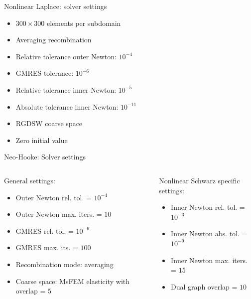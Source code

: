 \begin{frame}[noframenumbering]{Nonlinear Laplace: solver settings}
	\begin{itemize}
		\item $300\times 300$ elements per subdomain
		\item Averaging recombination
		\item Relative tolerance outer Newton: $10^{-4}$
		\item GMRES tolerance: $10^{-6}$
		\item Relative tolerance inner Newton: $10^{-5}$
		\item Absolute tolerance inner Newton: $10^{-11}$
		\item RGDSW coarse space
		\item Zero initial value
	\end{itemize}
\end{frame}

\begin{frame}[noframenumbering]{Neo-Hooke: Solver settings}
	\begin{columns}
		\begin{column}{0.55\textwidth}
			General settings:
			\vspace{7pt}
			\begin{itemize}
				\item Outer Newton rel. tol.  = $10^{-4}$
				\item Outer Newton max. iters. = $10$
				\item GMRES rel. tol. = $10^{-6}$
				\item GMRES max. its. = $100$
				\item Recombination mode: averaging
				\item Coarse space: MsFEM elasticity with overlap = $5$
			\end{itemize}
		\end{column}%
		\begin{column}{0.45\textwidth}
			Nonlinear Schwarz specific settings:
			\vspace{7pt}
			\begin{itemize}
				\item Inner Newton rel. tol. = $10^{-3}$
				\item Inner Newton abs. tol. = $10^{-9}$
				\item Inner Newton max. iters. = $15$
				\item Dual graph overlap = $10$
			\end{itemize}
		\end{column}
	\end{columns}
\end{frame}

